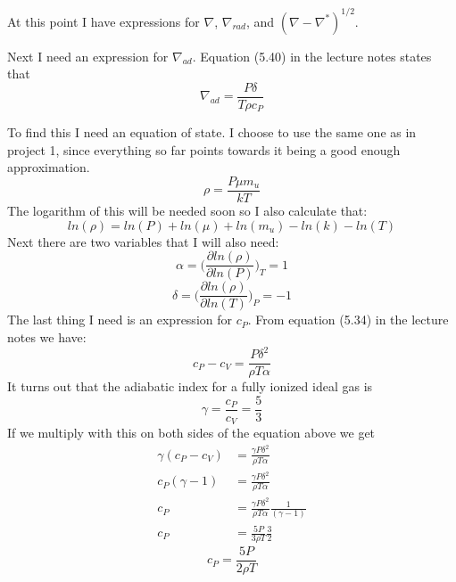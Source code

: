 \documentclass[a4paper,12pt]{article}
\begin{document}
At this point I have expressions for $\nabla$, $\nabla_{rad}$, and $(\nabla - \nabla^*)^{1/2}$.

Next I need an expression for $\nabla_{ad}$. Equation (5.40) in the lecture notes states that
\begin{equation}
 \nabla_{ad} = \frac{P\delta}{T\rho c_P}
\end{equation}

To find this I need an equation of state. 
I choose to use the same one as in project 1, since everything so far points towards it being a good enough approximation.
\begin{equation}
 \rho = \frac{P\mu m_u}{kT}
\end{equation}
The logarithm of this will be needed soon so I also calculate that:
\begin{equation}
 ln(\rho) = ln(P) + ln(\mu) + ln(m_u) -ln(k) - ln(T)
\end{equation}
Next there are two variables that I will also need:
\begin{equation}
\alpha = \bigg(\frac{\partial ln(\rho)}{\partial ln(P)}\bigg)_T = 1
\end{equation}
\begin{equation}
 \delta = \bigg(\frac{\partial ln(\rho)}{\partial ln(T)}\bigg)_P = -1
\end{equation}
The last thing I need is an expression for $c_P$.
From equation (5.34) in the lecture notes we have:
\begin{equation*}
 c_P - c_V = \frac{P\delta^2}{\rho T\alpha}
\end{equation*}
It turns out that the adiabatic index for a fully ionized ideal gas is
\begin{equation}
 \gamma = \frac{c_P}{c_V} = \frac{5}{3}
\end{equation}
If we multiply with this on both sides of the equation above we get
\begin{equation*}
\begin{aligned}
 \gamma(c_P - c_V) &= \frac{\gamma P\delta^2}{\rho T\alpha}\\
 c_P(\gamma - 1) &= \frac{\gamma P\delta^2}{\rho T\alpha}\\
c_P &= \frac{\gamma P\delta^2}{\rho T\alpha}\frac{1}{(\gamma - 1)}\\
c_P &= \frac{5P}{3\rho T}\frac{3}{2}
\end{aligned}
\end{equation*}
\begin{equation}
 c_P = \frac{5P}{2\rho T}
\end{equation}
\end{document}

